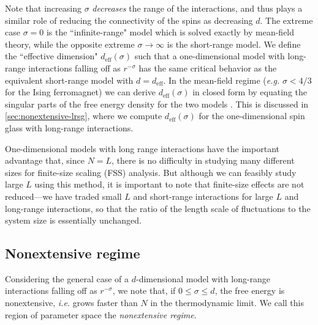 Note that increasing $\sigma$ \emph{decreases} the range of the interactions,
and thus plays a similar role of reducing the connectivity of the spins as
decreasing $d$. The extreme case $\sigma=0$ is the ``infinite-range" model
which is solved exactly by mean-field theory, while the opposite extreme
$\sigma\to\infty$ is the short-range model. We define the ``effective
dimension" $d_{\mathrm{eff}}(\sigma)$ such that a one-dimensional model with
long-range interactions falling off as $r^{-\sigma}$ has the same critical
behavior as the equivalent short-range model with $d=d_{\mathrm{eff}}$. In the
mean-field regime (\emph{e.g.} $\sigma<4/3$ for the Ising ferromagnet) we can
derive $d_{\mathrm{eff}}(\sigma)$ in closed form by equating the singular parts
of the free energy density for the two models \autocite{larson2010numerical}.
This is discussed in \cref{sec:nonextensive-lrsg}, where we compute
$d_{\mathrm{eff}}(\sigma)$ for the one-dimensional spin glass with long-range
interactions.

One-dimensional models with long range interactions have the important
advantage that, since $N=L$, there is no difficulty in studying many different
sizes for finite-size scaling (FSS) analysis. But although we can feasibly
study large $L$ using this method, it is important to note that finite-size
effects are not reduced---we have traded small $L$ and short-range interactions
for large $L$ and long-range interactions, so that the ratio of the length
scale of fluctuations to the system size is essentially unchanged.


\subsection{Nonextensive regime}

Considering the general case of a $d$-dimensional model with long-range
interactions falling off as $r^{-\sigma}$, we note that, if $0 \leq \sigma \leq
d$, the free energy is nonextensive, \emph{i.e.} grows faster than $N$ in the
thermodynamic limit. We call this region of parameter space the
\emph{nonextensive regime}.

